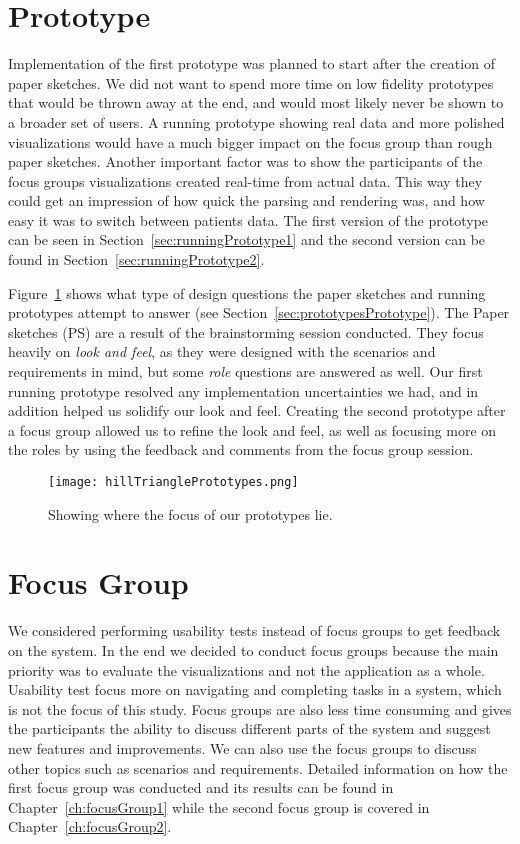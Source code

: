 \section{Prototype}
Implementation of the first prototype was planned to start after the creation of paper sketches. We did not want to spend more time on low fidelity prototypes that would be thrown away at the end, and would most likely never be shown to a broader set of users. A running prototype showing real data and more polished visualizations would have a much bigger impact on the focus group than rough paper sketches. Another important factor was to show the participants of the focus groups visualizations created real-time from actual data. This way they could get an impression of how quick the parsing and rendering was, and how easy it was to switch between patients data. The first version of the prototype can be seen in Section~\ref{sec:runningPrototype1} and the second version can be found in Section~\ref{sec:runningPrototype2}.

Figure~\ref{fig:hillTrianglePrototypex} shows what type of design questions the paper sketches and running prototypes attempt to answer (see Section~\ref{sec:prototypesPrototype}). The Paper sketches (PS) are a result of the brainstorming session conducted. They focus heavily on \textit{look and feel}, as they were designed with the scenarios and requirements in mind, but some \textit{role} questions are answered as well. Our first running prototype resolved any implementation uncertainties we had, and in addition helped us solidify our look and feel. Creating the second prototype after a focus group allowed us to refine the look and feel, as well as focusing more on the roles by using the feedback and comments from the focus group session.

\clearpage

\begin{figure}[t]
	\centering
		\texttt{[image: hillTrianglePrototypes.png]}
		\caption[Prototype focus]{Showing where the focus of our prototypes lie.}
		\label{fig:hillTrianglePrototypex}
\end{figure}

\section{Focus Group}
We considered performing usability tests instead of focus groups to get feedback on the system. In the end we decided to conduct focus groups because the main priority was to evaluate the visualizations and not the application as a whole. Usability test focus more on navigating and completing tasks in a system, which is not the focus of this study. Focus groups are also less time consuming and gives the participants the ability to discuss different parts of the system and suggest new features and improvements. We can also use the focus groups to discuss other topics such as scenarios and requirements. Detailed information on how the first focus group was conducted and its results can be found in Chapter~\ref{ch:focusGroup1} while the second focus group is covered in Chapter~\ref{ch:focusGroup2}.

